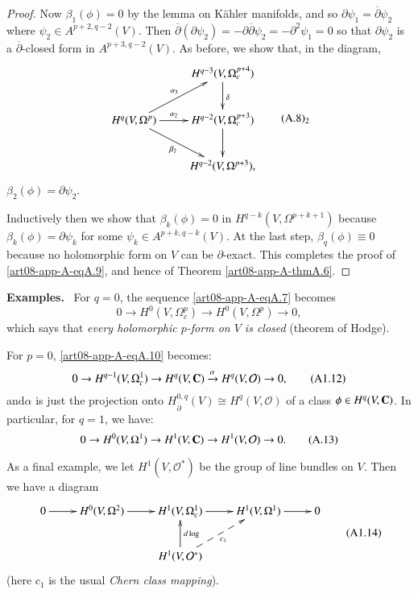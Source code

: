 \begin{proof}
Now $\beta_{1}(\phi)=0$ by the lemma on K\"ahler manifolds, and so $\partial \psi_{1}=\overline{\partial}\psi_{2}$ where $\psi_{2}\in A^{p+2,q-2}(V)$. Then $\overline{\partial}(\partial\psi_{2})=-\partial\overline{\partial}\psi_{2}=-\partial^{2}\psi_{1}=0$ so that $\partial \psi_{2}$ is a $\overline{\partial}$-closed form in $A^{p+3,q-2}(V)$. As before, we show that, in the diagram,
\begin{equation*}
\vcenter{\xymatrix{
 & H^{q-3}(V,\Omega^{p+4}_{c})\ar[d]^{\delta}\\
H^{q}(V,\Omega^{p})\ar[r]^-{\alpha_{2}}\ar[ur]^-{\alpha_{3}}\ar[dr]_-{\beta_{2}} & H^{q-2}(V,\Omega^{p+3}_{c})\ar[d]\\
 & H^{q-2}(V,\Omega^{p+3}),
}}\tag*{(A.8)$_{2}$}\label{art08-app-A-eqA.8-2}
\end{equation*}
$\beta_{2}(\phi)=\partial \psi_{2}$.

Inductively then we show that $\beta_{k}(\phi)=0$ in $H^{q-k}(V,\Omega^{p+k+1})$ because $\beta_{k}(\phi)=\partial \psi_{k}$ for some $\psi_{k}\in A^{p+k,q-k}(V)$. At the last step, $\beta_{q}(\phi)\equiv 0$ because no holomorphic form on $V$ can be $\partial$-exact. This completes the proof of \eqref{art08-app-A-eqA.9}, and hence of Theorem \ref{art08-app-A-thmA.6}.
\end{proof}

\smallskip
\noindent
{\bf Examples.}~
For $q=0$, the sequence \eqref{art08-app-A-eqA.7} becomes
\begin{equation*}
0\to H^{0}(V,\Omega^{p}_{c})\to H^{0}(V,\Omega^{p})\to 0,\tag{A.11}\label{art08-app-A-eqA.11}
\end{equation*}
which says that {\em every holomorphic $p$-form on $V$ is closed} (theorem of Hodge).

For $p=0$, \eqref{art08-app-A-eqA.10} becomes:
\begin{equation*}
0\to H^{q-1}(V,\Omega^{1}_{c})\to H^{q}(V,\mathbf{C})\xrightarrow{\alpha}H^{q}(V,\mathcal{O})\to 0,\tag{A1.12}\label{art08-app-A-eqA.12} 
\end{equation*}
and\pageoriginale $\alpha$ is just the projection onto $H^{0,q}_{\overline{\partial}}(V)\cong H^{q}(V,\mathcal{O})$ of a class $\phi\in H^{q}(V,\mathbf{C})$. In particular, for $q=1$, we have:
\begin{equation*}
0\to H^{0}(V,\Omega^{1})\to H^{1}(V,\mathbf{C})\to H^{1}(V,\mathcal{O})\to 0.\tag{A.13}\label{art08-app-A-eqA.13} 
\end{equation*}

As a final example, we let $H^{1}(V,\mathcal{O}^{*})$ be the group of line bundles on $V$. Then we have a diagram
\begin{equation*}
\vcenter{\xymatrix{
0\ar[r] & H^{0}(V,\Omega^{2})\ar[r] & H^{1}(V,\Omega^{1}_{c})\ar[r] & H^{1}(V,\Omega^{1})\ar[r] & 0\\
        &                          & H^{1}(V,\mathcal{O}^{*})\ar[u]_{d\log}\ar@{-->}[ur]_{c_{1}}
}}\tag{A1.14}\label{art08-app-A-eqA.14} 
\end{equation*}
(here $c_{1}$ is the usual {\em Chern class mapping}).
\smallskip

